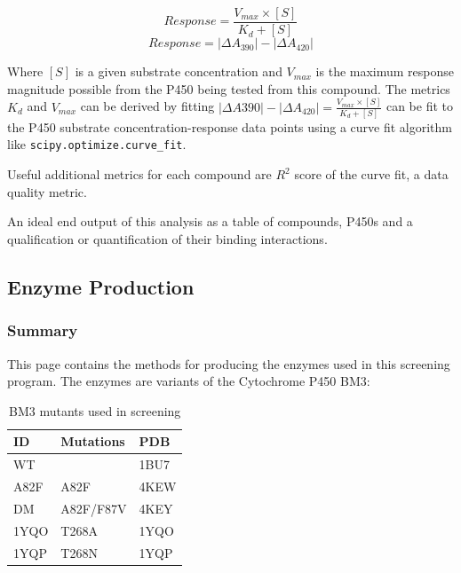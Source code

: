 \documentclass[16pt]{book}
\begin{document}
\begin{enumerate}
\begin{enumerate}
\begin{enumerate}
				\begin{equation}
					Response = \frac{V_{max} \times [S]}{K_{d} + [S]}
				\end{equation}
				\begin{equation}
					Response = |\Delta A_{390}| - |\Delta A_{420}| 
				\end{equation}

		   Where $[S]$ is a given substrate concentration and $V_{max}$ is the maximum response magnitude possible from the P450 being tested from this compound.
				The metrics $K_d$ and $V_{max}$ can be derived by fitting $|\Delta A{390}| - |\Delta A_{420}|= \frac{V_{max} \times [S]}{K_{d} + [S]}$ can be fit to the P450 substrate concentration-response  data points using a curve fit algorithm like \texttt{scipy.optimize.curve\_fit}.

		   Useful additional metrics for each compound are $R^2$ score of the curve fit, a data quality metric. 

		   An ideal end output of this analysis as a table of compounds, P450s and a qualification or quantification of their binding interactions.

		\end{enumerate}
   \end{enumerate}
\end{enumerate}

\subsection{Enzyme Production}

\subsubsection{Summary}

This page contains the methods for producing the enzymes used in this screening program.
The enzymes are variants of the Cytochrome P450 BM3:

\begin{table}
	\begin{center}
		\caption{\label{bm3_table} BM3 mutants used in screening}
		\begin{tabular}{l|p{3cm}|l}
		\textbf{ID} & \textbf{Mutations} & \textbf{PDB} \\
		\hline 
		WT   &           & 1BU7 \\
		A82F &   A82F    & 4KEW \\
		DM   & A82F/F87V & 4KEY \\
		1YQO &   T268A   & 1YQO \\
		1YQP &   T268N   & 1YQP \\
		\end{tabular}
	\end{center}
\end{table}
\end{document}
